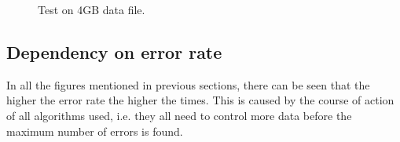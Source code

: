 \begin{figure}
\begin{minipage}{.5\linewidth}
\centering
{}
\end{minipage}%
\begin{minipage}{.5\linewidth}
\centering
{}
\end{minipage}\par\medskip

\caption{Test on 4GB data file.}
\label{fig_sizeRes}
\end{figure}


\subsection{Dependency on error rate}
In all the figures mentioned in previous sections, there can be seen that the higher the error rate the higher the times. This is caused by the course of action of all algorithms used, i.e. they all need to control more data before the maximum number of errors is found. %

